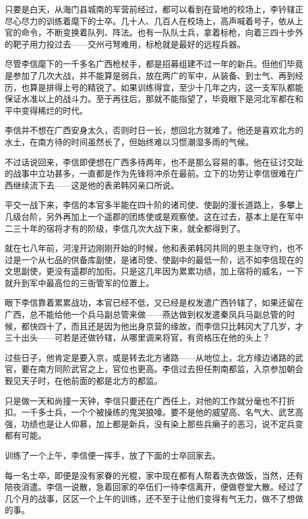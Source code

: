 只要是白天，从海门县城南的军营前经过，都可以看到在营地的校场上，李钤辖正尽心尽力的训练着麾下的士卒。几十人、几百人在校场上，高声喊着号子，依从上官的命令，不断变换着队列、阵法。也有一队队士兵，拿着标枪，向着三四十步外的靶子用力投过去——交州弓弩难用，标枪就是最好的远程兵器。

尽管李信麾下的一千多名广西枪杖手，都是招募组建不过一年的新兵。但他们毕竟是参加了几次大战，并不能算是弱兵，放在两广的军中，从装备、到士气、再到经历，也算是排得上号的精锐了。如果训练得宜，至少十几年之内，这一支军队都能保证水准以上的战斗力。至于再往后，那就不能指望了，毕竟眼下是河北军都在和平中变得稀烂的时代。

李信并不想在广西安身太久，否则时日一长，想回北方就难了。他还是喜欢北方的水土，在南方待的时间虽然长了，但始终难以习惯潮湿多雨的气候。

不过话说回来，李信即便想在广西多待两年，也不是那么容易的事。他在征讨交趾的战事中立功甚多，一直都是作为先锋将冲杀在最前。立下的功劳让李信很难在广西继续流下去——这是他的表弟韩冈亲口所说。

平交一战下来，李信的本官多半能在四十阶的诸司使、使副的漫长道路上，多攀上几级台阶，另外再加上一个遥郡的团练使或是观察使。这在过去，基本上是在军中二三十年的宿将才有的阶级，李信几次大战下来，就全都得到了。

就在七八年前，河湟开边刚刚开始的时候，他和表弟韩冈共同的恩主张守约，也不过是一个从七品的供备库副使，是诸司使、使副中的最低一阶，远不如李信现在的文思副使，更没有遥郡的加衔。只是这几年因为累累功绩，加上宿将的威名，一下就升到军中最高位的三衙管军的位置上。

眼下李信靠着累累战功，本官已经不低，又已经是权发遣广西钤辖了，如果还留在广西，总不能给他一个兵马副总管来做——燕达做到权发遣秦凤兵马副总管的时候，都快四十了，而且还是因为他出身京营的缘故，而李信只比韩冈大了几岁，才三十出头——可若是还做钤辖，从哪里调来将官，有资格压在他的头上？

过些日子，他肯定是要入京，或是转去北方诸路——从地位上，北方缘边诸路的武官，要在南方同阶武官之上，官位也更高。李信过去担任荆南都监，入京参加朝会觐见天子时，在他前面的都是北方的都监。

只是做一天和尚撞一天钟，李信只要还在广西任上，对他的工作就分毫也不打折扣。一千多士兵，一个个被操练的鬼哭狼嚎。要不是他的威望高、名气大、武艺高强，功绩也是让人仰慕，加上都是新兵，没有染上那些兵癞子的恶习，说不定兵变都有可能。

训练了一个上午，李信便一挥手，放了下面的士卒回家去。

每一名士卒，即便是没有家眷的光棍，家中现在都有人帮着洗衣做饭，当然，还有陪夜消遣。李信一说散，急着回家的卒伍们一待李信离开，便做卷堂大散。经过了几个月的战事，区区一个上午的训练，还不至于让他们变得有气无力，做不了想做的事。

